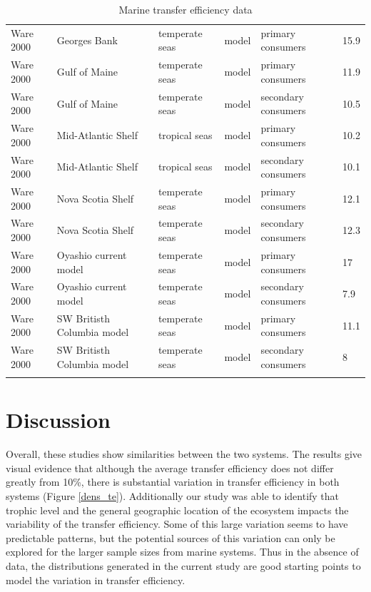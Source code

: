 \documentclass[oneside,12pt,final]{sty/ucthesis-CA2012}
\begin{document}
\begin{mainmatter}
\begin{longtable} {p{4cm}p{3cm}p{2cm}lp{2cm}p{2cm}}
    Ware 2000  & Georges Bank & temperate seas & model & primary consumers & 15.9 \\
    Ware 2000   & Gulf of Maine & temperate seas & model & primary consumers & 11.9 \\
    Ware 2000  & Gulf of Maine & temperate seas & model & secondary consumers & 10.5 \\
    Ware 2000  & Mid-Atlantic Shelf & tropical seas & model & primary consumers & 10.2 \\
    Ware 2000   & Mid-Atlantic Shelf & tropical seas & model & secondary consumers & 10.1 \\
    Ware 2000   & Nova Scotia Shelf & temperate seas & model & primary consumers & 12.1 \\
    Ware 2000   & Nova Scotia Shelf & temperate seas & model & secondary consumers & 12.3 \\
    Ware 2000   & Oyashio current model & temperate seas & model & primary consumers & 17 \\
    Ware 2000   & Oyashio current model & temperate seas & model & secondary consumers & 7.9 \\
    Ware 2000   & SW Britisth Columbia model & temperate seas & model & primary consumers & 11.1 \\
    Ware 2000   & SW Britisth Columbia model & temperate seas & model & secondary consumers & 8 \\
    \bottomrule
    \caption{Marine transfer efficiency data}
    \label{datamar}
    \end{longtable}


\section*{Discussion}
Overall, these studies show similarities between the two systems. The results give visual evidence that although the average transfer efficiency does not differ greatly from 10\%, there is substantial variation in transfer efficiency in both systems (Figure \ref{dens_te}). Additionally our study was able to identify that trophic level and the general geographic location of the ecosystem impacts the variability of the transfer efficiency. Some of this large variation seems to have predictable patterns, but the potential sources of this variation can only be explored for the larger sample sizes from marine systems. Thus in the absence of data, the distributions generated in the current study are good starting points to model the variation in transfer efficiency. 


\end{mainmatter}
\end{document}
